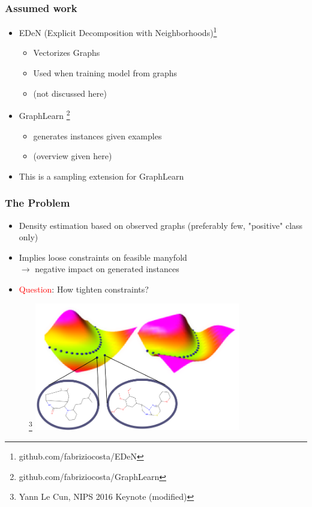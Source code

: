 \documentclass{beamer}
\newcommand{\red}[1]{\textcolor{red}{#1}}
\begin{document}
\begin{frame}
\frametitle{Assumed work}
    \begin{itemize}
        \item EDeN (Explicit Decomposition with Neighborhoods)\footnote{github.com/fabriziocosta/EDeN}
        \begin{itemize}
            \item Vectorizes Graphs
            \item Used when training model from graphs
            \item (not discussed here)
        \end{itemize}    
    
    \item GraphLearn \footnote{github.com/fabriziocosta/GraphLearn} 
        \begin{itemize}
            \item generates instances given examples
            \item (overview given here)
        \end{itemize}    
        \item This is a sampling extension for GraphLearn
    \end{itemize}    

\end{frame}
\begin{frame}
\frametitle{The Problem}
    \begin{itemize}
        \item Density estimation based on observed graphs (preferably few, "positive"
            class only)
        \item Implies loose constraints on feasible manyfold\\
            $\rightarrow$ negative impact on generated instances
        \item \red{Question}: How tighten constraints?
    \end{itemize}
    \begin{figure}[ht]
        \centering
        \footnote{ Yann Le Cun, NIPS 2016 Keynote (modified)}
        \includegraphics[width=0.8\textwidth]{images/valley.png}
    \end{figure}    
\end{frame}
\end{document}
